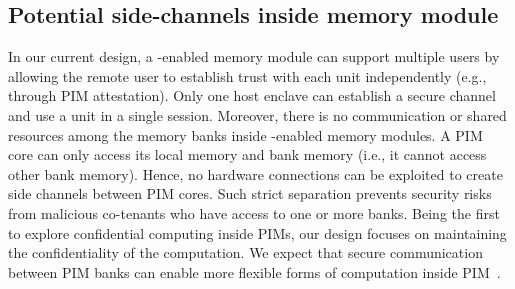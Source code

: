 \subsection{Potential side-channels inside memory module}
In our current design, a \thename-enabled memory module can support multiple users by allowing the remote user to establish trust with each \thename unit independently (e.g., through PIM attestation). Only one host enclave can establish a secure channel and use a \thename unit in a single session.
Moreover, there is no communication or shared resources among the memory banks inside \thename-enabled memory modules. A PIM core can only access its local memory and bank memory (i.e., it cannot access other bank memory). Hence, no hardware connections can be exploited to create side channels between PIM cores. Such strict separation prevents security risks from malicious co-tenants who have access to one or more \thename banks. Being the first to explore confidential computing inside PIMs, our design focuses on maintaining the confidentiality of the computation. We expect that secure communication between PIM banks can enable more flexible forms of computation inside PIM~\cite{tesseract}. 
